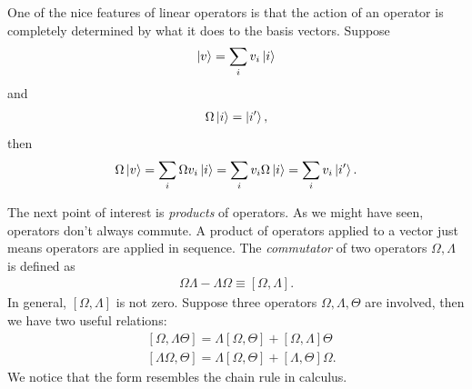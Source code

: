\documentclass{book}
\theoremstyle{definition}
\newcommand{\lb}{\left[}
\newcommand{\rb}{\right]}
\begin{document}
One of the nice features of linear operators is that the action of an operator is completely determined by what it does to the basis vectors. Suppose 
\begin{align}
\ket{v} = \sum_i v_i \ket{i}
\end{align}
and 
\begin{align}
\Omega\ket{i} = \ket{i'},
\end{align}
then
\begin{align}
\Omega \ket{v} = \sum_i \Omega v_i \ket{i}= \sum_iv_i \Omega\ket{i} = \sum_iv_i\ket{i'}.
\end{align}



The next point of interest is \textit{products} of operators. As we might have seen, operators don't always commute. A product of operators applied to a vector just means operators are applied in sequence. The \textit{commutator} of two operators $\Omega, \Lambda$ is defined as
\begin{align}
\Omega\Lambda - \Lambda\Omega \equiv \lb \Omega,\Lambda \rb.
\end{align}
In general, $\lb \Omega,\Lambda\rb$ is not zero. Suppose three operators $\Omega, \Lambda, \Theta$ are involved, then we have two useful relations:
\begin{align}
&\lb \Omega, \Lambda\Theta \rb = \Lambda\lb \Omega, \Theta \rb + \lb \Omega, \Lambda \rb \Theta\\
&\lb \Lambda\Omega, \Theta \rb = \Lambda\lb \Omega, \Theta \rb + \lb \Lambda, \Theta \rb \Omega.
\end{align}
We notice that the form resembles the chain rule in calculus. 
\end{document}
